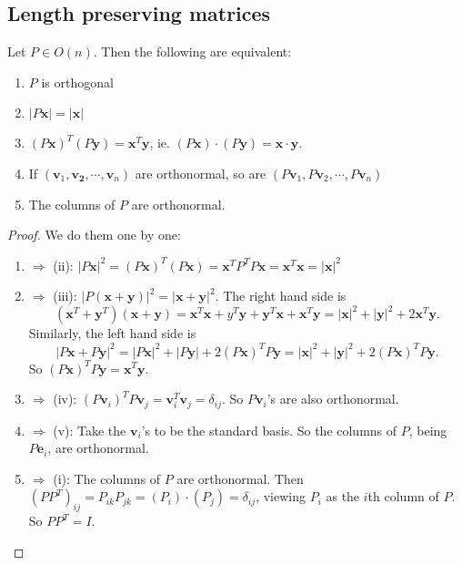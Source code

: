 \documentclass[a4paper]{article}
\begin{document}
      \subsection{Length preserving matrices}
      \begin{thm}
        Let $P\in O(n)$. Then the following are equivalent:
        \begin{enumerate}
          \item $P$ is orthogonal
          \item $|P\mathbf{x}| = |\mathbf{x}|$
          \item $(P\mathbf{x})^T(P\mathbf{y}) = \mathbf{x}^T\mathbf{y}$, ie. $(P\mathbf{x})\cdot(P\mathbf{y}) = \mathbf{x}\cdot \mathbf{y}$.
          \item If $(\mathbf{v}_1, \mathbf{v_2}, \cdots, \mathbf{v}_n)$ are orthonormal, so are $(P\mathbf{v}_1, P\mathbf{v}_2, \cdots, P\mathbf{v}_n)$
          \item The columns of $P$ are orthonormal. 
        \end{enumerate}
      \end{thm}

      \begin{proof}
        We do them one by one:
        \begin{enumerate}
          \item $\Rightarrow$ (ii): $|P\mathbf{x}|^2 = (P\mathbf{x})^T(P\mathbf{x}) = \mathbf{x}^TP^TP\mathbf{x} = \mathbf{x}^T\mathbf{x} = |\mathbf{x}|^2$
          \item $\Rightarrow$ (iii): $|P(\mathbf{x} + \mathbf{y})|^2 = |\mathbf{x + y}|^2$. The right hand side is
            \[
              (\mathbf{x}^T + \mathbf{y}^T)(\mathbf{x + y}) = \mathbf{x}^T\mathbf{x} + y^T\mathbf{y} + \mathbf{y}^T\mathbf{x} + \mathbf{x}^T\mathbf{y} = |\mathbf{x}|^2 + |\mathbf{y}|^2  + 2\mathbf{x}^T\mathbf{y}.
            \]
            Similarly, the left hand side is
            \[
              |P\mathbf{x} + P\mathbf{y}|^2 = |P\mathbf{x}|^2 + |P\mathbf{y}| + 2(P\mathbf{x})^TP\mathbf{y} = |\mathbf{x}|^2 + |\mathbf{y}|^2 + 2(P\mathbf{x})^TP\mathbf{y}.
            \]
            So $(P\mathbf{x})^TP\mathbf{y} = \mathbf{x}^T\mathbf{y}$.
          \item $\Rightarrow$ (iv): $(P\mathbf{v}_i)^TP\mathbf{v}_j = \mathbf{v}_i^T\mathbf{v}_j = \delta_{ij}$. So $P\mathbf{v}_i$'s are also orthonormal.
          \item $\Rightarrow$ (v): Take the $\mathbf{v}_i$'s to be the standard basis. So the columns of $P$, being $P\mathbf{e}_i$, are orthonormal.
          \item $\Rightarrow$ (i): The columns of $P$ are orthonormal. Then $(PP^T)_{ij} = P_{ik}P_{jk} = (P_i)\cdot (P_j) = \delta_{ij}$, viewing $P_i$ as the $i$th column of $P$. So $PP^T = I$.
        \end{enumerate}
      \end{proof}
\end{document}

